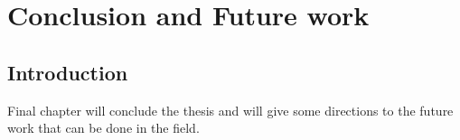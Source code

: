 \chapter{Conclusion and Future work}
\section{Introduction}
Final chapter will conclude the thesis and will give some directions to the future work that can be done in the field.
